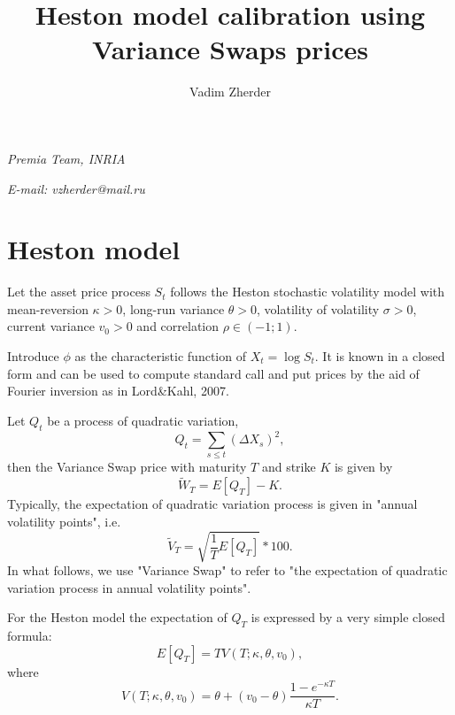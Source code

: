 \documentclass[12pt,amsfonts,enumerate,amscd]{amsart}
\numberwithin{table}{section}
\numberwithin{equation}{section}
\begin{document}
\title[Heston model calibration]{Heston model calibration using Variance Swaps prices}

\author[Vadim Zherder]{Vadim Zherder}


\maketitle

\vspace*{10pt}  \centerline{\footnotesize\it Premia Team, INRIA}

\centerline{\footnotesize\it
E-mail: vzherder@mail.ru}

 
\vskip0.2cm
\maketitle

\section{Heston model}

Let the asset price process $S_t$ follows the Heston stochastic volatility model with mean-reversion $\kappa>0$, long-run variance $\theta>0$, volatility of volatility $\sigma>0$, current variance $v_0>0$ and correlation $\rho\in (-1;1)$.

Introduce $\phi$ as the characteristic function of $X_t = \log S_t$. It is known in a closed form and can be used to compute standard call and put prices by the aid of Fourier inversion as in Lord\&Kahl, 2007.

Let $Q_t$ be a process of quadratic variation, 
\[
Q_t = \sum_{s\le t} \left(\Delta X_s\right)^2, 
\]
then the Variance Swap price with maturity $T$ and strike $K$ is given by
\[
\tilde {W}_T = E\left[ Q_T\right] - K. 
\]
  Typically, the expectation of quadratic variation process is given in "annual volatility points", i.e. 
\[
\tilde{V}_T = \sqrt{ \frac{1}{T} E\left[ Q_T\right]} * 100.
\]
In what follows, we use "Variance Swap" to refer to "the expectation of quadratic variation process in annual volatility points".

For the Heston model the expectation of $Q_T$ is expressed by a very simple closed formula:
\[
E\left[ Q_T\right] = T V(T;\kappa, \theta, v_0), 
\]
where
\[
 V(T;\kappa, \theta, v_0)=\theta + (v_0 - \theta) \frac{1-e^{-\kappa T}}{\kappa T}.
\]
\end{document}
